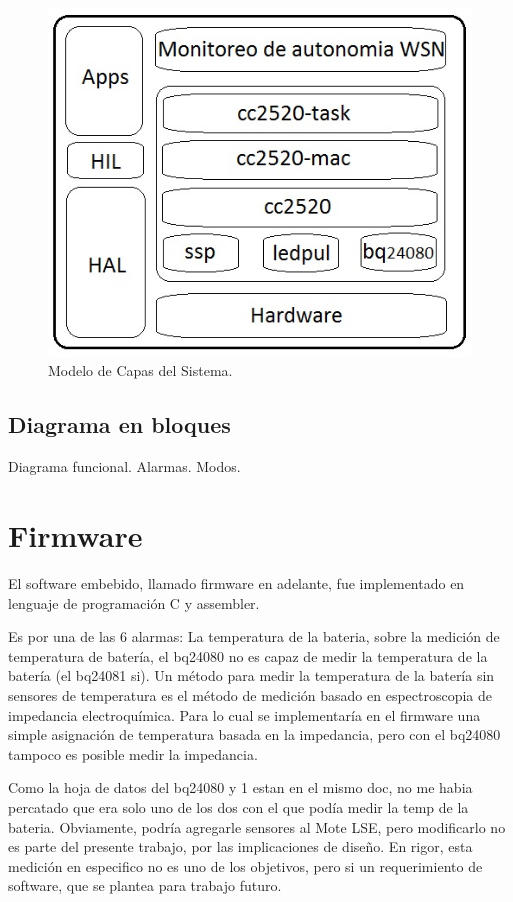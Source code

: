{\begin{figure}[h!]
	\centering
    \includegraphics[width=.5\textwidth]{./Figures/arq.png}
    	\caption{Modelo de Capas del Sistema.}
	\label{fig:capas}
\end{figure}
\subsection{Diagrama en bloques}
\label{subsec:bloques} 
Diagrama funcional.
Alarmas.
Modos.

\section{Firmware}
\label{sec:firm}
El software embebido, llamado firmware en adelante, fue implementado en lenguaje de programación C y assembler.

Es por una de las 6 alarmas: La temperatura de la bateria, sobre la medición de temperatura de batería, el bq24080 no es capaz de medir la temperatura de la batería (el bq24081 si). Un método para medir la temperatura de la batería sin sensores de temperatura es el método de medición basado en espectroscopia de impedancia electroquímica\citep{metodo}. Para lo cual se implementaría en el firmware una simple asignación de temperatura basada en la impedancia, pero con el bq24080 tampoco es posible medir la impedancia.

Como la hoja de datos del bq24080 y 1 estan en el mismo doc, no me habia percatado que era solo uno de los dos con el que podía medir la temp de la bateria.
Obviamente, podría agregarle sensores al Mote LSE, pero modificarlo no es parte del presente trabajo, por las implicaciones de diseño.
En rigor, esta medición en especifico no es uno de los objetivos, pero si un requerimiento de software, que se plantea para trabajo futuro.

}
